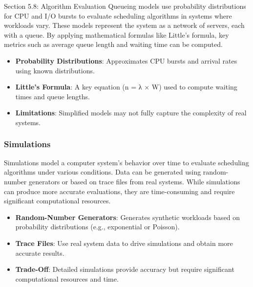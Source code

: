 \begin{notes}{Section 5.8: Algorithm Evaluation}
    Queueing models use probability distributions for CPU and I/O bursts to evaluate scheduling algorithms in systems where workloads vary. These models represent the system as a network of servers, 
    each with a queue. By applying mathematical formulas like Little’s formula, key metrics such as average queue length and waiting time can be computed.
    
    \begin{highlight}
    
        \begin{itemize}
            \item \textbf{Probability Distributions}: Approximates CPU bursts and arrival rates using known distributions.
            \item \textbf{Little’s Formula}: A key equation (n = λ × W) used to compute waiting times and queue lengths.
            \item \textbf{Limitations}: Simplified models may not fully capture the complexity of real systems.
        \end{itemize}
    
    \end{highlight}
    
    \subsubsection*{Simulations}
    
    Simulations model a computer system’s behavior over time to evaluate scheduling algorithms under various conditions. Data can be generated using random-number generators or based on trace files 
    from real systems. While simulations can produce more accurate evaluations, they are time-consuming and require significant computational resources.
    
    \begin{highlight}[Simulations]
    
        \begin{itemize}
            \item \textbf{Random-Number Generators}: Generates synthetic workloads based on probability distributions (e.g., exponential or Poisson).
            \item \textbf{Trace Files}: Use real system data to drive simulations and obtain more accurate results.
            \item \textbf{Trade-Off}: Detailed simulations provide accuracy but require significant computational resources and time.
        \end{itemize}
    

\end{highlight}
\end{notes}
